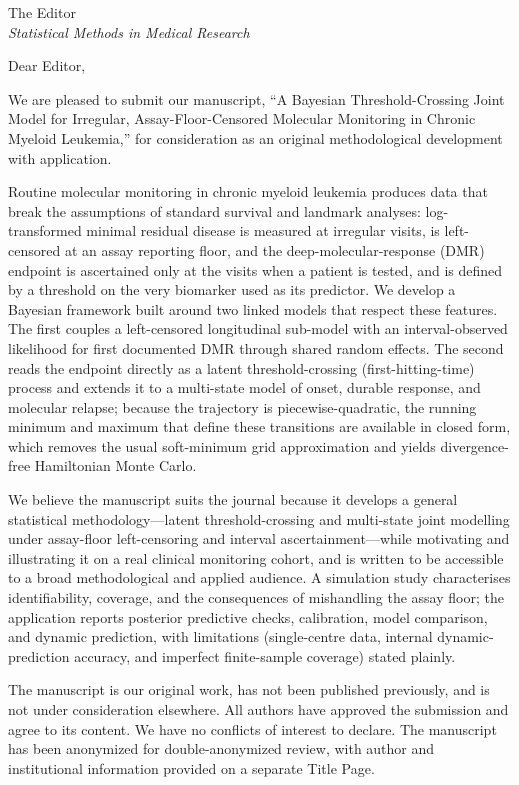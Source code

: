 \documentclass[11pt]{article}
\begin{document}
\thispagestyle{empty}

\noindent The Editor\\
\emph{Statistical Methods in Medical Research}

\bigskip
\noindent Dear Editor,

\bigskip
We are pleased to submit our manuscript, ``A Bayesian Threshold-Crossing Joint Model for
Irregular, Assay-Floor-Censored Molecular Monitoring in Chronic Myeloid
Leukemia,'' for
consideration as an original methodological development with application.

Routine molecular monitoring in chronic myeloid leukemia produces data that
break the assumptions of standard survival and landmark analyses:
log-transformed minimal residual disease is measured at irregular visits, is
left-censored at an assay reporting floor, and the deep-molecular-response
(DMR) endpoint is ascertained only at the visits when a patient is tested, and
is defined by a threshold on the very biomarker used as its predictor. We
develop a Bayesian framework built around two linked models that respect these
features. The first couples a left-censored longitudinal sub-model with an
interval-observed likelihood for first documented DMR through shared random
effects. The second reads the endpoint directly as a latent
threshold-crossing (first-hitting-time) process and extends it to a
multi-state model of onset, durable response, and molecular relapse; because
the trajectory is piecewise-quadratic, the running minimum and maximum that
define these transitions are available in closed form, which removes the usual
soft-minimum grid approximation and yields divergence-free Hamiltonian Monte
Carlo.

We believe the manuscript suits the journal because it develops a general
statistical methodology---latent threshold-crossing and multi-state joint
modelling under assay-floor left-censoring and interval ascertainment---while
motivating and illustrating it on a real clinical monitoring cohort, and is
written to be accessible to a broad methodological and applied audience. A
simulation study characterises identifiability, coverage, and the consequences
of mishandling the assay floor; the application reports posterior predictive
checks, calibration, model comparison, and dynamic prediction, with
limitations (single-centre data, internal dynamic-prediction accuracy, and
imperfect finite-sample coverage) stated plainly.

The manuscript is our original work, has not been published previously, and is
not under consideration elsewhere. All authors have approved the submission and
agree to its content. We have no conflicts of interest to declare. The
manuscript has been anonymized for double-anonymized review, with author and
institutional information provided on a separate Title Page.
\end{document}
